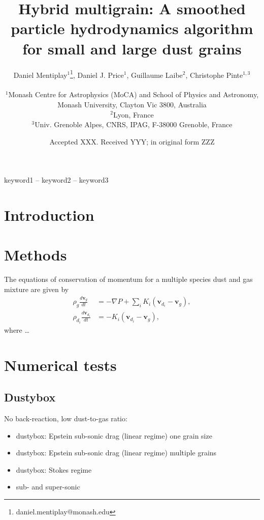 \documentclass[fleqn,usenatbib]{mnras}
\title[Hybrid multigrain]{Hybrid multigrain: A smoothed particle hydrodynamics
algorithm for small and large dust grains}
\author[Mentiplay, Price, Laibe, \& Pinte]{%
   \parbox{\textwidth}{%
      Daniel Mentiplay$^{1}$\thanks{daniel.mentiplay@monash.edu},
      Daniel J. Price$^{1}$,
      Guillaume Laibe$^{2}$,
      Christophe Pinte$^{1,3}$}\\
   $^{1}$Monash Centre for Astrophysics (MoCA) and School of Physics and
   Astronomy, Monash University, Clayton Vic 3800, Australia \\
   $^{2}$Lyon, France \\
   $^{3}$Univ. Grenoble Alpes, CNRS, IPAG, F-38000 Grenoble, France}
\date{Accepted XXX. Received YYY; in original form ZZZ}
\let\vec\mathbf
\begin{document}
\label{firstpage}
\pagerange{\pageref{firstpage}--\pageref{lastpage}}
\maketitle

\begin{abstract}
\end{abstract}

\begin{keywords}
keyword1 -- keyword2 -- keyword3
\end{keywords}



\section{Introduction}

\section{Methods}

The equations of conservation of momentum for a multiple species dust and gas
mixture are given by
%
\begin{align}
   \rho_g \frac{d \vec{v}_g}{dt} &= - \nabla P + \sum_i K_i \left(\vec{v}_{d_i}
                                    - \vec{v}_{g}\right), \\
   \rho_{d_i} \frac{d \vec{v}_{d_i}}{dt} &= - K_i \left(\vec{v}_{d_i}
                                                       - \vec{v}_{g}\right),
\end{align}
%
where \ldots


\section{Numerical tests}

\subsection{Dustybox}

No back-reaction, low dust-to-gas ratio:

\begin{itemize}
   \item dustybox: Epstein sub-sonic drag (linear regime) one grain size
   \item dustybox: Epstein sub-sonic drag (linear regime) multiple grains
   \item dustybox: Stokes regime
   \item sub- and super-sonic
\end{itemize}
\end{document}
